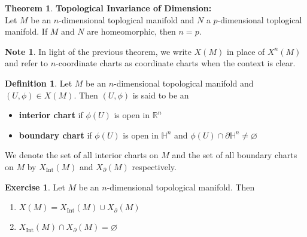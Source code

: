 \documentclass{book}
\theoremstyle{definition}
\newtheorem{defn}[definition]{Definition}
\newtheorem{note}[definition]{Note}
\newtheorem{thm}[definition]{Theorem}
\newtheorem{ex}[definition]{Exercise}
\renewcommand{\H}{\mathbb{H}}
\newcommand{\R}{\mathbb{R}}
\DeclareMathOperator{\Int}{Int}
\DeclareMathOperator*{\0}{\mbf{0}}
\DeclareMathOperator*{\1}{\mbf{1}}
\newcommand{\tbf}[1]{\textbf{#1}}
\newcommand{\p}{\partial}
\begin{document}
	\begin{thm} \tbf{Topological Invariance of Dimension:} \\
		Let $M$ be an $n$-dimensional toplogical manifold and $N$ a $p$-dimensional toplogical manifold. If $M$ and $N$ are homeomorphic, then $n = p$.
	\end{thm}

	\begin{note}
		In light of the previous theorem, we write $X(M)$ in place of $X^n(M)$ and refer to $n$-coordinate charts as coordinate charts when the context is clear.
	\end{note}

	\begin{defn}
		Let $M$ be an $n$-dimensional topological manifold and $(U, \phi) \in X(M)$. Then $(U, \phi)$ is said to be an
		\begin{itemize}
			\item \tbf{interior chart} if $\phi(U)$ is open in $\R^n$ 
			\item \tbf{boundary chart} if $\phi(U)$ is open in $\H^n$ and $\phi(U) \cap \p \H^n \neq \varnothing$
		\end{itemize}
		We denote the set of all interior charts on $M$ and the set of all boundary charts on $M$ by $X_{\Int}(M)$ and $X_{\p}(M)$ respectively. 
	\end{defn}

	\begin{ex}
		Let $M$ be an $n$-dimensional topological manifold. Then 
		\begin{enumerate}
			\item $X(M) = X_{\Int}(M) \cup X_{\p}(M)$
			\item $X_{\Int}(M) \cap X_{\p}(M) = \varnothing$
		\end{enumerate}
	\end{ex}
\end{document}
